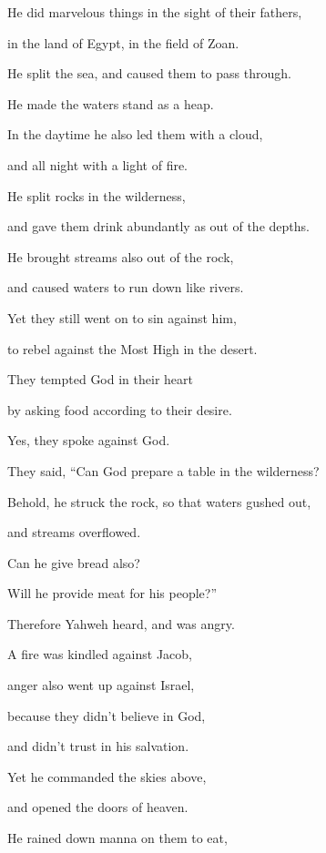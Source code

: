 {\par }{\Q {}He did marvelous things in the sight of their fathers,
\par }{\QB in the land of Egypt, in the field of Zoan.
\par }{\Q {}He split the sea, and caused them to pass through.
\par }{\QB He made the waters stand as a heap.
\par }{\Q {}In the daytime he also led them with a cloud,
\par }{\QB and all night with a light of fire.
\par }{\Q {}He split rocks in the wilderness,
\par }{\QB and gave them drink abundantly as out of the depths.
\par }{\Q {}He brought streams also out of the rock,
\par }{\QB and caused waters to run down like rivers.
\par }{\Q {}Yet they still went on to sin against him,
\par }{\QB to rebel against the Most High in the desert.
\par }{\Q {}They tempted God in their heart
\par }{\QB by asking food according to their desire.
\par }{\Q {}Yes, they spoke against God.
\par }{\QB They said, “Can God prepare a table in the wilderness?
\par }{\Q {}Behold, he struck the rock, so that waters gushed out,
\par }{\QB and streams overflowed.
\par }{\Q Can he give bread also?
\par }{\QB Will he provide meat for his people?”
\par }{\Q {}Therefore Yahweh heard, and was angry.
\par }{\QB A fire was kindled against Jacob,
\par }{\QB anger also went up against Israel,
\par }{\Q {}because they didn’t believe in God,
\par }{\QB and didn’t trust in his salvation.
\par }{\Q {}Yet he commanded the skies above,
\par }{\QB and opened the doors of heaven.
\par }{\Q {}He rained down manna on them to eat,
}
